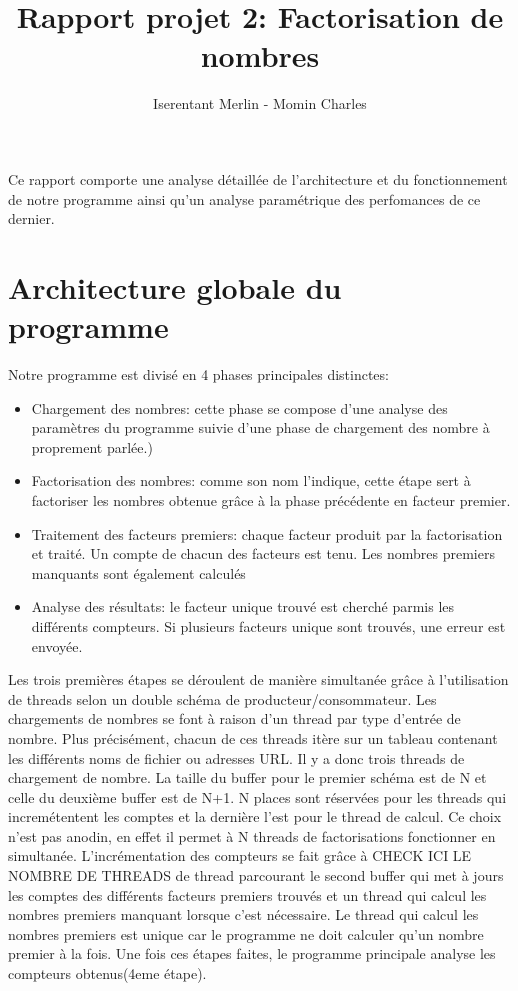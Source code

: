 \documentclass[11pt,a4paper]{article}
\begin{document}
\author{Iserentant Merlin - Momin Charles}
\title{Rapport projet 2: Factorisation de nombres}
\maketitle

Ce rapport comporte une analyse détaillée de l'architecture et du fonctionnement de notre programme ainsi qu'un analyse paramétrique des perfomances de ce dernier. 

\section*{Architecture globale du programme}
Notre programme est divisé en 4 phases principales distinctes:

\begin{itemize}
\item{Chargement des nombres: cette phase se compose d'une analyse des paramètres du programme suivie d'une phase de chargement des nombre à proprement parlée.)}
\item{Factorisation des nombres: comme son nom l'indique, cette étape sert à factoriser les nombres obtenue grâce à la phase précédente en facteur premier.}
\item{Traitement des facteurs premiers: chaque facteur produit par la factorisation et traité. Un compte de chacun des facteurs est tenu. Les nombres premiers manquants sont également calculés}
\item{Analyse des résultats: le facteur unique trouvé est cherché parmis les différents compteurs. Si plusieurs facteurs unique sont trouvés, une erreur est envoyée.}
\end{itemize}

Les trois premières étapes se déroulent de manière simultanée grâce à l'utilisation de threads selon un double schéma de producteur/consommateur. Les chargements de nombres se font à raison d'un thread par type d'entrée de nombre. Plus précisément, chacun de ces threads itère sur un tableau contenant les différents noms de fichier ou adresses URL. Il y a donc trois threads de chargement de nombre.  La taille du buffer pour le premier schéma est de N et celle du deuxième buffer est de N+1. N places sont réservées pour les threads qui incremétentent les comptes et la dernière l'est pour le thread de calcul. Ce choix n'est pas anodin, en effet il permet à N threads de factorisations fonctionner en simultanée. L'incrémentation des compteurs se fait grâce à CHECK ICI LE NOMBRE DE THREADS de thread parcourant le second buffer qui met à jours les comptes des différents facteurs premiers trouvés et un thread qui calcul les nombres premiers manquant lorsque c'est nécessaire.
Le thread qui calcul les nombres premiers est unique car le programme ne doit calculer qu'un nombre premier à la fois. 
Une fois ces étapes faites, le programme principale analyse les compteurs obtenus(4eme étape).
\end{document}
